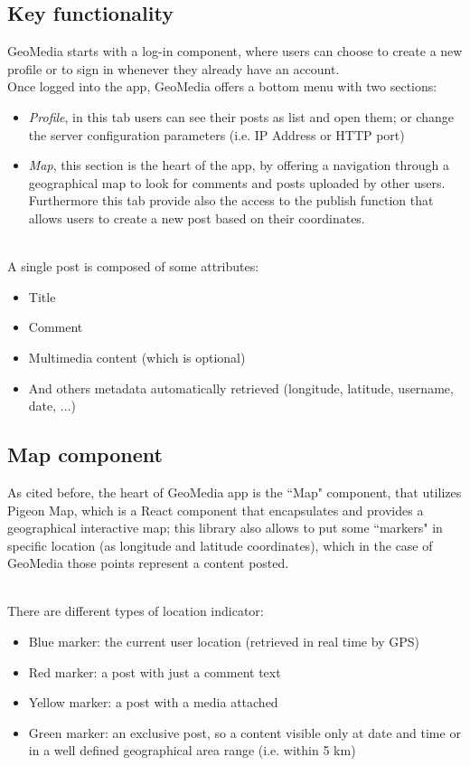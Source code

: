 \documentclass[conference]{IEEEtran}
\begin{document}
\subsection{Key functionality }

GeoMedia starts with a log-in component, where users can choose to create a new profile or to sign in whenever they already have an account.
\\
Once logged into the app, GeoMedia offers a bottom menu with two sections: 
\begin{itemize}
    \item \textit{Profile}, in this tab users can see their posts as list and open them; or change the server configuration parameters (i.e. IP Address or HTTP port)
    \item  \textit{Map}, this section is the heart of the app, by offering a navigation through a geographical map to look for comments and posts uploaded by other users. Furthermore this tab provide also the access to the publish function that allows users to create a new post based on their coordinates.
\end{itemize}

\\
A single post is composed of some attributes:
\begin{itemize}
    \item Title
    \item Comment
    \item Multimedia content (which is optional)
    \item And others metadata automatically retrieved (longitude, latitude, username, date, ...)
\end{itemize}

\subsection{Map component}

As cited before, the heart of GeoMedia app is the ``Map" component, that utilizes Pigeon Map\cite{b8}, which is a React component that encapsulates and provides a geographical interactive map; this library also allows to put some ``markers" in specific location (as longitude and latitude coordinates), which in the case of GeoMedia those points represent a content posted.

\\

There are different types of location indicator:
\begin{itemize}
\item Blue marker: the current user location (retrieved in real time by GPS)
\item Red marker: a post with just a comment text
\item Yellow marker: a post with a media attached
\item Green marker: an exclusive post, so a content visible only at date and time or in a well defined geographical area range (i.e. within 5 km)
\end{itemize}
\end{document}

